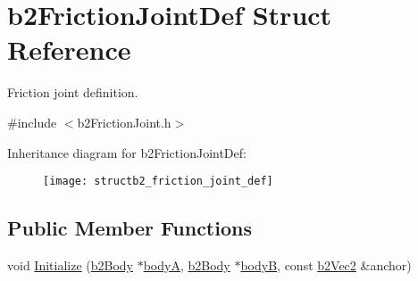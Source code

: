 \hypertarget{structb2_friction_joint_def}{}\section{b2\+Friction\+Joint\+Def Struct Reference}
\label{structb2_friction_joint_def}


Friction joint definition.  




{\ttfamily \#include $<$b2\+Friction\+Joint.\+h$>$}

Inheritance diagram for b2\+Friction\+Joint\+Def\+:\begin{figure}[H]
\begin{center}
\leavevmode
\texttt{[image: structb2\_friction\_joint\_def]}
\end{center}
\end{figure}
\subsection*{Public Member Functions}
\begin{DoxyCompactItemize}
\item 
void \hyperlink{structb2_friction_joint_def_aee104f2aeb34dec4e17e3c52a98f7915}{Initialize} (\hyperlink{classb2_body}{b2\+Body} $\ast$\hyperlink{structb2_joint_def_a8cd54c93da396be75a9788f2c6897f05}{bodyA}, \hyperlink{classb2_body}{b2\+Body} $\ast$\hyperlink{structb2_joint_def_aa4f4dee2fbcd12187b19506b60e68e3d}{bodyB}, const \hyperlink{structb2_vec2}{b2\+Vec2} \&anchor)
\end{DoxyCompactItemize}
